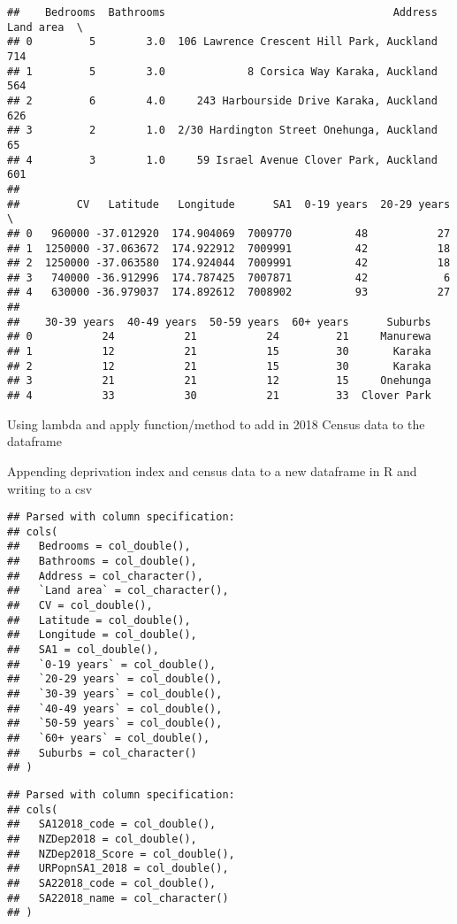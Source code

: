 \documentclass[
]{article}
\begin{document}
\begin{verbatim}
##    Bedrooms  Bathrooms                                    Address Land area  \
## 0         5        3.0  106 Lawrence Crescent Hill Park, Auckland       714   
## 1         5        3.0             8 Corsica Way Karaka, Auckland       564   
## 2         6        4.0     243 Harbourside Drive Karaka, Auckland       626   
## 3         2        1.0  2/30 Hardington Street Onehunga, Auckland        65   
## 4         3        1.0     59 Israel Avenue Clover Park, Auckland       601   
## 
##         CV   Latitude   Longitude      SA1  0-19 years  20-29 years  \
## 0   960000 -37.012920  174.904069  7009770          48           27   
## 1  1250000 -37.063672  174.922912  7009991          42           18   
## 2  1250000 -37.063580  174.924044  7009991          42           18   
## 3   740000 -36.912996  174.787425  7007871          42            6   
## 4   630000 -36.979037  174.892612  7008902          93           27   
## 
##    30-39 years  40-49 years  50-59 years  60+ years      Suburbs  
## 0           24           21           24         21     Manurewa  
## 1           12           21           15         30       Karaka  
## 2           12           21           15         30       Karaka  
## 3           21           21           12         15     Onehunga  
## 4           33           30           21         33  Clover Park
\end{verbatim}

Using lambda and apply function/method to add in 2018 Census data to the
dataframe

Appending deprivation index and census data to a new dataframe in R and
writing to a csv

\begin{verbatim}
## Parsed with column specification:
## cols(
##   Bedrooms = col_double(),
##   Bathrooms = col_double(),
##   Address = col_character(),
##   `Land area` = col_character(),
##   CV = col_double(),
##   Latitude = col_double(),
##   Longitude = col_double(),
##   SA1 = col_double(),
##   `0-19 years` = col_double(),
##   `20-29 years` = col_double(),
##   `30-39 years` = col_double(),
##   `40-49 years` = col_double(),
##   `50-59 years` = col_double(),
##   `60+ years` = col_double(),
##   Suburbs = col_character()
## )
\end{verbatim}

\begin{verbatim}
## Parsed with column specification:
## cols(
##   SA12018_code = col_double(),
##   NZDep2018 = col_double(),
##   NZDep2018_Score = col_double(),
##   URPopnSA1_2018 = col_double(),
##   SA22018_code = col_double(),
##   SA22018_name = col_character()
## )
\end{verbatim}
\end{document}

